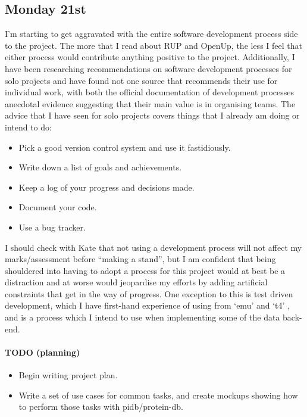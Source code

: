 \subsection{Monday 21st}
I'm starting to get aggravated with the entire software development process side
to the project. The more that I read about RUP and OpenUp, the less I feel that
either process would contribute anything positive to the project. Additionally,
I have been researching recommendations on software development processes for
solo projects and have found not one source that recommends their use for
individual work, with both the official documentation of development processes
anecdotal evidence suggesting that their main value is in organising teams. The
advice that I have seen for solo projects covers things that I already am doing
or intend to do:

\begin{itemize}
\item Pick a good version control system and use it fastidiously.
\item Write down a list of goals and achievements.
\item Keep a log of your progress and decisions made.
\item Document your code.
\item Use a bug tracker.
\end{itemize}

I should check with Kate that not using a development process will not affect my
marks/assessment before ``making a stand'', but I am confident that being
shouldered into having to adopt a process for this project would at best be a
distraction and at worse would jeopardise my efforts by adding artificial
constraints that get in the way of progress. One exception to this is test
driven development, which I have first-hand experience of using from `emu'
\cite{Cummins2013} and `t4' \cite{Cummins2013a}, and is a process which I intend
to use when implementing some of the data back-end.

\paragraph{TODO (planning)}
\begin{itemize}
\item Begin writing project plan.
\item Write a set of use cases for common tasks, and create mockups showing how
  to perform those tasks with pidb/protein-db.
\end{itemize}

